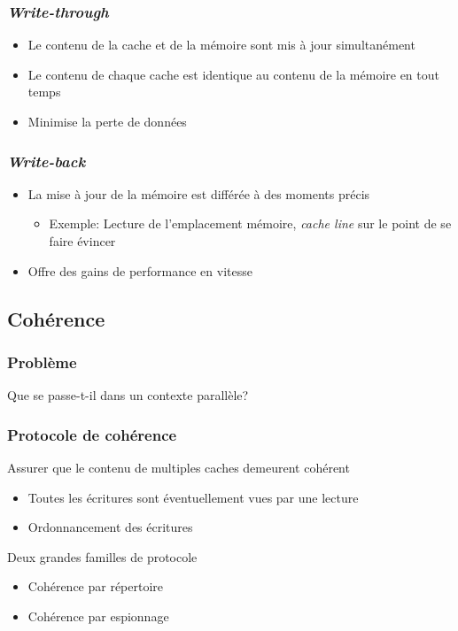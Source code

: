 \documentclass{beamer}
\begin{document}
\begin{frame}
\frametitle{\textit{Write-through}}
\begin{itemize}
\item Le contenu de la cache et de la mémoire sont mis à jour simultanément
\item Le contenu de chaque cache est identique au contenu de la mémoire en tout temps
\item Minimise la perte de données
\end{itemize}
\end{frame}

\begin{frame}
\frametitle{\textit{Write-back}}
\begin{itemize}
\item La mise à jour de la mémoire est différée à des moments précis
\begin{itemize}
\item Exemple: Lecture de l'emplacement mémoire, \textit{cache line} sur le point de se faire évincer
\end{itemize}
\item Offre des gains de performance en vitesse
\end{itemize}
\end{frame}

\subsection{Cohérence}
\begin{frame}
\frametitle{Problème}
\begin{center}
\LARGE{Que se passe-t-il dans un contexte parallèle?}
\end{center}
\end{frame}

\begin{frame}
\frametitle{Protocole de cohérence}
Assurer que le contenu de multiples caches demeurent cohérent
\begin{itemize}
\item Toutes les écritures sont éventuellement vues par une lecture
\item Ordonnancement des écritures
\end{itemize}

Deux grandes familles de protocole
\begin{itemize}
\item Cohérence par répertoire
\item Cohérence par espionnage
\end{itemize}
\end{frame}
\end{document}
